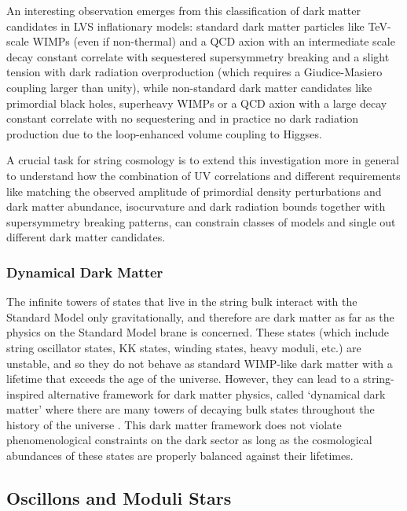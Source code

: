 An interesting observation emerges from this classification of dark matter candidates in LVS inflationary models: standard dark matter particles like TeV-scale WIMPs (even if non-thermal) and a QCD axion with an intermediate scale decay constant correlate with sequestered supersymmetry breaking and a slight tension with dark radiation overproduction (which requires a Giudice-Masiero coupling larger than unity), while non-standard dark matter candidates like primordial black holes, superheavy WIMPs or a QCD axion with a large decay constant correlate with no sequestering and in practice no dark radiation production due to the loop-enhanced volume coupling to Higgses.

A crucial task for string cosmology is to extend this investigation more in general to understand how the combination of UV correlations and different requirements like matching the observed amplitude of primordial density perturbations and dark matter abundance, isocurvature and dark radiation bounds together with supersymmetry breaking patterns, can constrain classes of models and single out different dark matter candidates.

\subsubsection{Dynamical Dark Matter}

The infinite towers of states that live in the string bulk interact with the Standard Model only gravitationally, and therefore are dark matter as far as the physics on the Standard Model brane is concerned. These states (which include string oscillator states, KK states, winding states, heavy moduli, etc.) are unstable, and so they do not behave as standard WIMP-like dark matter with a lifetime that exceeds the age of the universe. However, they can lead to a string-inspired alternative framework for dark matter physics, called `dynamical dark matter' where there are many towers of decaying bulk states throughout the history of the universe \cite{Dienes:2011ja, Dienes:2011sa, Dienes:2016vei}. This dark matter framework does not violate phenomenological constraints on the dark sector as long as the cosmological abundances of these states are properly balanced against their lifetimes.   

\subsection{Oscillons and Moduli Stars}

